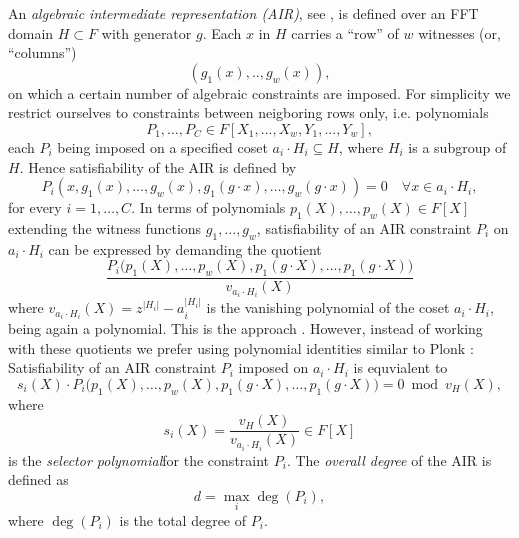 \documentclass[11pt]{article}
\theoremstyle{definition}
\theoremstyle{remark}
\begin{document}
An \textit{algebraic intermediate representation (AIR)}, see \cite{Starks, DEEPFRI, ethSTARK}, is defined over an FFT domain $H\subset F$ with generator $g$. 
Each $x$ in $H$ carries a ``row'' of $w$ witnesses (or, ``columns'')
\[
(g_1(x),.., g_w(x)),
\]
on which a certain number of algebraic constraints are imposed.
For simplicity we restrict ourselves to constraints between neigboring rows only, i.e. polynomials 
\[
P_1, \ldots ,P_{C}\in F[X_1,...,X_w,Y_1,...,Y_w],  
\] 
each $P_i$ being imposed on a specified coset $a_i\cdot H_i\subseteq H$, where $H_i$ is a subgroup of $H$.
Hence satisfiability of the AIR is defined by 
\begin{equation}
\label{e:AIRConstraint}
P_i(x, g_1(x),\ldots ,g_w(x),g_1(g\cdot x), \ldots,g_w(g\cdot x)) = 0 \quad \forall x \in a_i\cdot H_i,
\end{equation}
for every $i=1,\ldots,C$.
In terms of polynomials $p_1(X),\ldots, p_w(X)\in F[X]$ extending the witness functions $g_1, \ldots, g_w$, satisfiability of an AIR constraint $P_i$ on $a_i\cdot H_i$ can be expressed by demanding the quotient
\[
\frac{P_i\big(p_1(X), \ldots, p_w(X), p_1(g\cdot X), \ldots, p_1(g\cdot X)\big) }{ v_{a_i\cdot H_i}(X)}
\]
where $v_{a_i\cdot H_i}(X) = z^{|H_i|} - a_i^{|H_i|}$ is the vanishing polynomial of the coset $a_i\cdot H_i$, being again a polynomial.
This is the approach \cite{Starks, DEEPFRI, ethSTARK}.
However, instead of working with these quotients we prefer using polynomial identities similar to Plonk \cite{Plonk}:
Satisfiability of an AIR constraint $P_i$ imposed on $a_i\cdot H_i$ is equvialent to 
\begin{equation}
\label{e:AIRConstraintIdentity}
s_i(X) \cdot P_i\big(p_1(X), \ldots, p_w(X), p_1(g\cdot X), \ldots, p_1(g\cdot X)\big) 
= 0 \bmod v_H(X),
\end{equation}
where  
\begin{equation}
\label{e:SelectorPoly}
s_i(X) =\frac{v_H(X)}{v_{a_i\cdot H_i}(X)}  \in F[X]
\end{equation}
is the \textit{selector polynomial}\footnotemark for the constraint $P_i$.
%
The \textit{overall degree} of the AIR is defined as
\begin{equation}
d = \max_i \deg(P_i),
\end{equation}
where $\deg(P_i)$ is the total degree of $P_i$.
\end{document}
